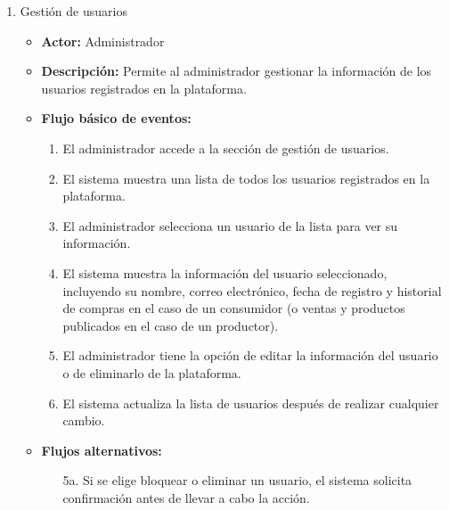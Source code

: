 \begin{enumerate}[CU-1:]
\item{Gestión de usuarios}
\begin{itemize}
	\item \textbf{Actor:} Administrador
	\item \textbf{Descripción:} Permite al administrador gestionar la información de los usuarios registrados en la plataforma.
	\item \textbf{Flujo básico de eventos:}
	\begin{enumerate}[1:]
		\item El administrador accede a la sección de gestión de usuarios.
		\item El sistema muestra una lista de todos los usuarios registrados en la plataforma.
		\item El administrador selecciona un usuario de la lista para ver su información.
		\item El sistema muestra la información del usuario seleccionado, incluyendo su nombre, correo electrónico, fecha de registro y historial de compras en el caso de un consumidor (o ventas y productos publicados en el caso de un productor).
		\item El administrador tiene la opción de editar la información del usuario o de eliminarlo de la plataforma.
		\item El sistema actualiza la lista de usuarios después de realizar cualquier cambio.
		\end{enumerate}
	\item \textbf{Flujos alternativos:}
	\begin{itemize}
		\item [5a.] Si se elige bloquear o eliminar un usuario, el sistema solicita confirmación antes de llevar a cabo la acción.
		\end{itemize}
\end{itemize}


\end{enumerate}
